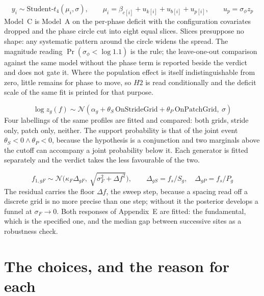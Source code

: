 \documentclass[10pt,a4paper]{article}
\begin{document}
\[
y_i\sim\text{Student-}t_4(\mu_i,\sigma),\qquad \mu_i=\beta_{c[i]}+u_{k[i]}+u_{b[i]}+u_{p[i]},\qquad u_p=\sigma_\phi z_p
\]
Model~C is Model~A on the per-phase deficit with the configuration covariates dropped and the phase circle cut into eight equal slices. Slices presuppose no shape: any systematic pattern around the circle widens the spread. The magnitude reading $\Pr(\sigma_\phi<\log1.1)$ is the rule; the leave-one-out comparison against the same model without the phase term is reported beside the verdict and does not gate it. Where the population effect is itself indistinguishable from zero, little remains for phase to move, so $H2$ is read conditionally and the deficit scale of the same fit is printed for that purpose.

\[
\log z_g(f)\sim\mathcal N(\alpha_g+\theta_S\,\mathrm{OnStrideGrid}+\theta_P\,\mathrm{OnPatchGrid},\ \sigma)
\]
Four labellings of the same profiles are fitted and compared: both grids, stride only, patch only, neither. The support probability is that of the joint event $\theta_S<0\wedge\theta_P<0$, because the hypothesis is a conjunction and two marginals above the cutoff can accompany a joint probability below it. Each generator is fitted separately and the verdict takes the less favourable of the two.

\[
f_{1,gF}\sim\mathcal N\!\big(\kappa_F\Delta_{gF},\ \sqrt{\sigma_F^2+\Delta f^2}\big),\qquad \Delta_{gS}=f_s/S_g,\quad \Delta_{gP}=f_s/P_g
\]
The residual carries the floor $\Delta f$, the sweep step, because a spacing read off a discrete grid is no more precise than one step; without it the posterior develops a funnel at $\sigma_F\to0$. Both responses of Appendix~E are fitted: the fundamental, which is the specified one, and the median gap between successive sites as a robustness check.

\section{The choices, and the reason for each}
\end{document}
